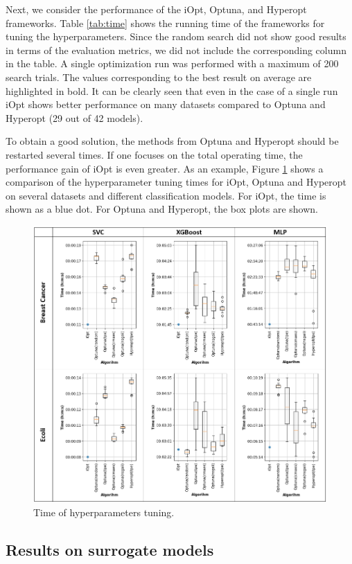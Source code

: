 \documentclass[iicol]{sn-jnl}
\theoremstyle{thmstyleone}%
\theoremstyle{thmstyletwo}%
\theoremstyle{thmstylethree}%
\begin{document}
Next, we consider the performance of the iOpt, Optuna, and Hyperopt frameworks. Table \ref{tab:time} shows the running time of the frameworks for tuning the hyperparameters.
Since the random search did not show good results in terms of the evaluation metrics, we did not include the corresponding column in the table. 
A single optimization run was performed with a maximum of 200 search trials. The values corresponding to the best result on average are highlighted in bold. It can be clearly seen that even in the case of a single run iOpt shows better performance on many datasets compared to Optuna and Hyperopt (29 out of 42 models).

To obtain a good solution, the methods from Optuna and Hyperopt should be restarted several times. If one focuses on the total operating time, the performance gain of iOpt is even greater. As an example, Figure \ref{fig8} shows a comparison of the hyperparameter tuning times for iOpt, Optuna and Hyperopt on several datasets and different classification models. For iOpt, the time is shown as a blue dot. For Optuna and Hyperopt, the box plots are shown.

\begin{figure}
\centering
\includegraphics[width=\textwidth]{fig_time}
\caption{Time of hyperparameters tuning.} \label{fig8}
\end{figure}

\subsection{Results on surrogate models}
\end{document}
